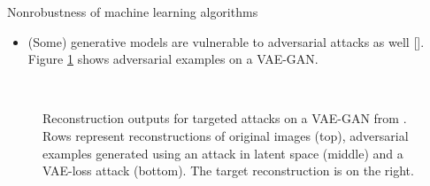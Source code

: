 \documentclass{beamer}
\newcommand{\citet}[1]{{\color{citecolor}\relscale{0.8}\textcite{#1}}}
\newcommand{\citep}[1]{{\color{citecolor}\relscale{0.8}[\textcite{#1}]}}
\begin{document}
\begin{frame}[allowframebreaks=0.9]{Nonrobustness of machine learning algorithms}
	\begin{itemize}
		\item (Some) generative models are vulnerable to adversarial attacks as well \citep{Kos:2018:AEGM, Goodfellow:2014:EHAE}. Figure \ref{fig:vae-gan-targetad-face} shows adversarial examples on a VAE-GAN.
	\end{itemize}
	\begin{figure}[htbp!]
		\begin{center}
			~
		\end{center}
		\caption{Reconstruction outputs for targeted attacks on a VAE-GAN from \citet{Kos:2018:AEGM}. Rows represent reconstructions of original images (top), adversarial examples generated using an attack in latent space (middle) and a VAE-loss attack (bottom). The target reconstruction is on the right.}
		\label{fig:vae-gan-targetad-face}
	\end{figure}
\end{frame}
\end{document}
